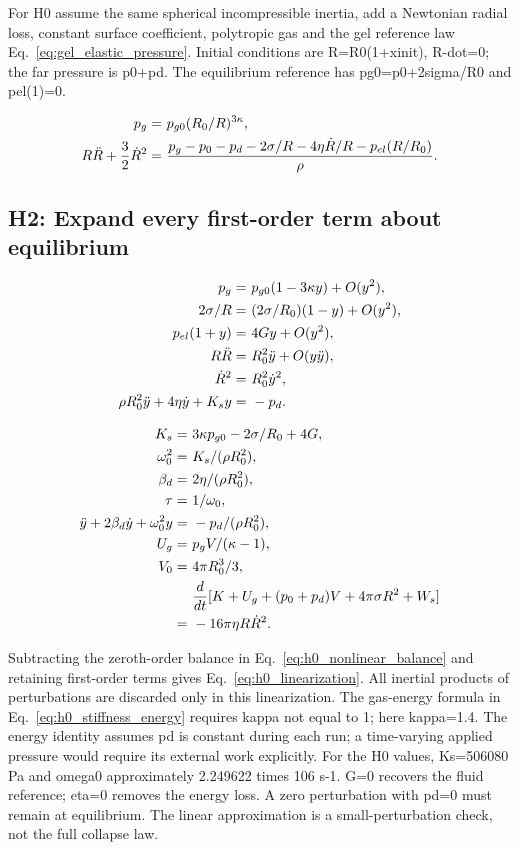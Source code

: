 \documentclass[11pt]{article}
\begin{document}
For H0 assume the same spherical incompressible inertia, add a Newtonian radial loss, constant surface coefficient, polytropic gas and the gel reference law Eq.~\eqref{eq:gel_elastic_pressure}. Initial conditions are R=R0(1+xinit), R-dot=0; the far pressure is p0+pd. The equilibrium reference has pg0=p0+2sigma/R0 and pel(1)=0.

\begin{align}
p_g= & ~p_{g0}(R_0/R)^{3\kappa}, \notag \\
R\ddot R+\frac32\dot R^2= & ~\frac{p_g-p_0-p_d-2\sigma/R-4\eta\dot R/R-p_{el}(R/R_0)}\rho. \label{eq:h0_nonlinear_balance}
\end{align}

\subsection{H2: Expand every first-order term about equilibrium}

\begin{align}
p_g= & ~p_{g0}(1-3\kappa y)+O(y^2), \notag \\
2\sigma/R= & ~(2\sigma/R_0)(1-y)+O(y^2), \notag \\
p_{el}(1+y)= & ~4Gy+O(y^2), \notag \\
R\ddot R= & ~R_0^2\ddot y+O(y\ddot y), \notag \\
\dot R^2= & ~R_0^2\dot y^2, \notag \\
\rho R_0^2\ddot y+4\eta\dot y+K_sy= & ~-p_d. \label{eq:h0_linearization}
\end{align}

\begin{align}
K_s= & ~3\kappa p_{g0}-2\sigma/R_0+4G, \notag \\
\omega_0^2= & ~K_s/(\rho R_0^2), \notag \\
\beta_d= & ~2\eta/(\rho R_0^2), \notag \\
\tau= & ~1/\omega_0, \notag \\
\ddot y+2\beta_d\dot y+\omega_0^2y= & ~-p_d/(\rho R_0^2), \notag \\
U_g= & ~p_gV/(\kappa-1), \notag \\
V_0= & ~4\pi R_0^3/3, \notag \\
& ~\frac{d}{dt}[K+U_g+(p_0+p_d)V+4\pi\sigma R^2+W_s] \notag \\
= & ~-16\pi\eta R\dot R^2. \label{eq:h0_stiffness_energy}
\end{align}

Subtracting the zeroth-order balance in Eq.~\eqref{eq:h0_nonlinear_balance} and retaining first-order terms gives Eq.~\eqref{eq:h0_linearization}. All inertial products of perturbations are discarded only in this linearization. The gas-energy formula in Eq.~\eqref{eq:h0_stiffness_energy} requires kappa not equal to 1; here kappa=1.4. The energy identity assumes pd is constant during each run; a time-varying applied pressure would require its external work explicitly. For the H0 values, Ks=506080 Pa and omega0 approximately 2.249622 times 106 s-1. G=0 recovers the fluid reference; eta=0 removes the energy loss. A zero perturbation with pd=0 must remain at equilibrium. The linear approximation is a small-perturbation check, not the full collapse law.
\end{document}

